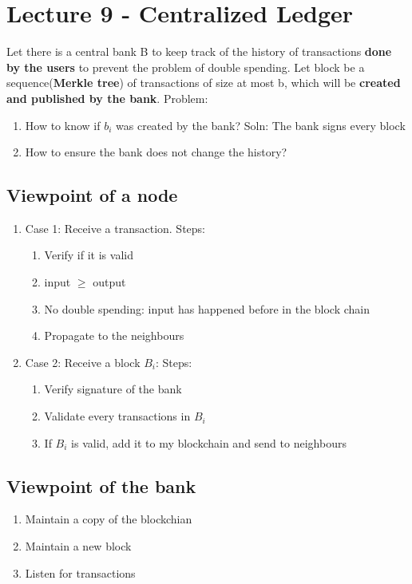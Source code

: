 \documentclass[../main.tex]{subfile}
\begin{document}
\section{Lecture 9 - Centralized Ledger}
Let there is a central bank B to keep track of the history of transactions \textbf{done by the users} to prevent the problem of double spending. Let block be a sequence(\textbf{Merkle tree}) of transactions of size at most b, which will be \textbf{created and published by the bank}. Problem:
\begin{enumerate}
	\item How to know if $b_{i}$ was created by the bank? Soln: The bank signs every block
	\item How to ensure the bank does not change the history?
\end{enumerate}
\subsection{Viewpoint of a node}
\begin{enumerate}
	\item Case 1: Receive a transaction. Steps:
		\begin{enumerate}
			\item Verify if it is valid
			\item input $\ge$  output
			\item No double spending: input has happened before in the block chain
			\item Propagate to the neighbours
		\end{enumerate}
	\item Case 2: Receive a block $B_{i}$: Steps:
		\begin{enumerate}
			\item Verify signature of the bank
			\item Validate every transactions in $B_{i}$ 
			\item If $B_{i}$ is valid, add it to my blockchain and send to neighbours
		\end{enumerate}
\end{enumerate}
\subsection{Viewpoint of the bank}
\begin{enumerate}
	\item Maintain a copy of the blockchian
	\item Maintain a new block
	\item Listen for transactions
\end{enumerate}
\end{document}

